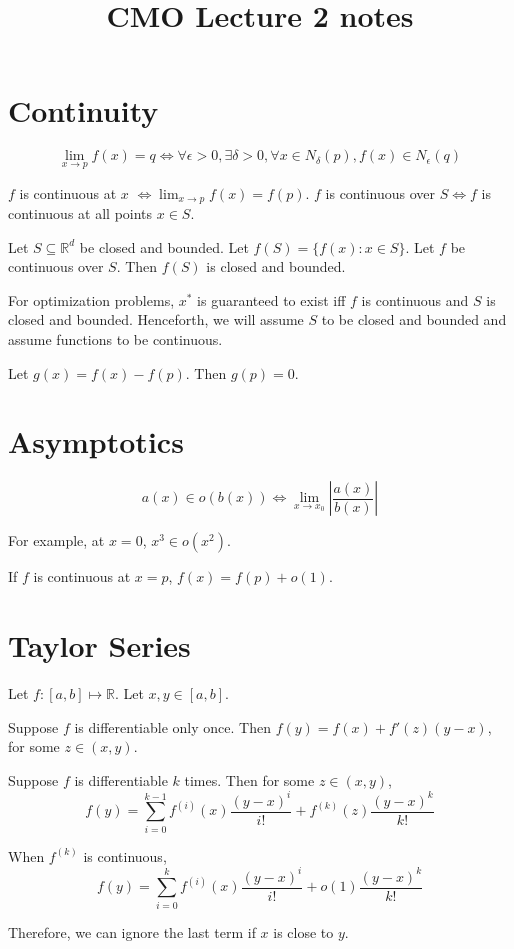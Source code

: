 

\title{CMO Lecture 2 notes}



\maketitle
\initMinimal{}

\section{Continuity}

\begin{definition}
\[ \lim_{x\rightarrow p} f(x) = q \iff \forall \epsilon > 0, \exists \delta > 0,
\forall x \in N_{\delta}(p), f(x) \in N_{\epsilon}(q) \]
\end{definition}

\begin{definition}
$f$ is continuous at $x$ $\iff \lim_{x\rightarrow p} f(x) = f(p)$.
$f$ is continuous over $S \iff f$ is continuous at all points $x \in S$.
\end{definition}

\begin{theorem}
Let $S \subseteq \mathbb{R}^d$ be closed and bounded.
Let $f(S) = \{f(x): x \in S\}$.
Let $f$ be continuous over $S$.
Then $f(S)$ is closed and bounded.
\end{theorem}

For optimization problems, $x^*$ is guaranteed to exist iff
$f$ is continuous and $S$ is closed and bounded.
Henceforth, we will assume $S$ to be closed and bounded
and assume functions to be continuous.

Let $g(x) = f(x) - f(p)$. Then $g(p) = 0$.

\section{Asymptotics}

\[ a(x) \in o(b(x)) \iff \lim_{x \rightarrow x_0} \left| \frac{a(x)}{b(x)} \right| \]

For example, at $x=0$, $x^3 \in o(x^2)$.

If $f$ is continuous at $x=p$, $f(x) = f(p) + o(1)$.

\section{Taylor Series}

Let $f: [a,b] \mapsto \mathbb{R}$.
Let $x, y \in [a, b]$.

Suppose $f$ is differentiable only once.
Then $f(y) = f(x) + f'(z)(y-x)$, for some $z \in (x, y)$.

Suppose $f$ is differentiable $k$ times. Then for some $z \in (x, y)$,
\[ f(y) = \sum_{i=0}^{k-1}f^{(i)}(x)\frac{(y-x)^i}{i!} + f^{(k)}(z)\frac{(y-x)^k}{k!} \]

When $f^{(k)}$ is continuous,
\[ f(y) = \sum_{i=0}^k f^{(i)}(x)\frac{(y-x)^i}{i!} + o(1)\frac{(y-x)^k}{k!} \]

Therefore, we can ignore the last term if $x$ is close to $y$.


